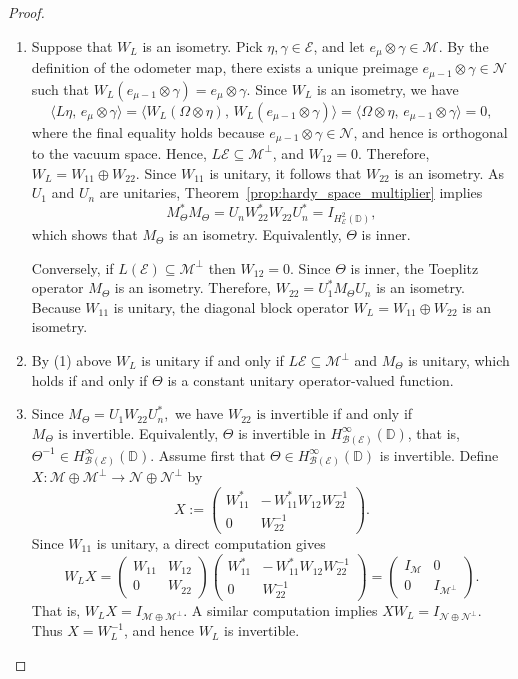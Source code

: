 \documentclass[10pt,a4paper]{amsart}
\def \D{\mathbb{D}}
\newcommand{\clb}{\mathcal{B}}
\newcommand{\cle}{\mathcal{E}}
\newcommand{\clm}{\mathcal{M}}
\newcommand{\cln}{\mathcal{N}}
\begin{document}
\begin{proof}
\begin{enumerate}
        \item 
Suppose that $W_L$ is an isometry. Pick $\eta, \gamma \in \cle$, and let $e_\mu \otimes \gamma \in \clm$. By the definition of the odometer map, there exists a unique preimage $e_{\mu-1} \otimes  \gamma \in \cln$ such that $W_L( e_{\mu-1} \otimes  \gamma)=e_\mu \otimes \gamma$.
Since $W_L$ is an isometry, we have
\[
\langle L\eta,\, e_\mu \otimes \gamma \rangle
=
\langle W_L(\Omega \otimes \eta),\, W_L( e_{\mu-1} \otimes  \gamma) \rangle
= \langle \Omega \otimes \eta,\, e_{\mu-1} \otimes  \gamma \rangle = 0,
\]
where the final equality holds because $e_{\mu-1}\otimes\gamma \in \cln$, and hence is orthogonal to the vacuum space. Hence, $L\cle \subseteq \clm^\perp$, and $W_{12} = 0$. Therefore, $W_L = W_{11} \oplus W_{22}$. Since $W_{11}$ is unitary, it follows that $W_{22}$ is an isometry. As $U_1$ and $U_n$ are unitaries, Theorem~\ref{prop:hardy_space_multiplier} implies
\[
M_{\Theta}^*M_{\Theta}
=
U_n W_{22}^* W_{22} U_n^*
=
I_{H^2_\cle(\D)},
\]
which shows that $M_{\Theta}$ is an isometry. Equivalently, $\Theta$ is inner.

Conversely, if $L(\cle)\subseteq \clm^\perp$ then $W_{12}=0.$ Since $\Theta$ is inner, the Toeplitz operator $M_\Theta$ is an isometry. Therefore, $W_{22}=U_1^*M_\Theta U_n$ is an isometry. Because $W_{11}$ is unitary, the diagonal block operator $W_L = W_{11} \oplus W_{22}$ is an isometry.

\item By (1) above \(W_L\) is unitary if
and only if $L\cle\subseteq\clm^\perp$ and \(M_\Theta\) is unitary, which holds if and only if \(\Theta\) is
a constant unitary operator-valued function.
\item
Since $M_\Theta = U_1 W_{22} U_n^*,$ we have $W_{22}\text{ is invertible}$ if and only if $
M_\Theta\text{ is invertible}.$
Equivalently, \(\Theta\) is invertible in
\(H^\infty_{\clb(\cle)}(\D)\), that is,
\(\Theta^{-1}\in H^\infty_{\clb(\cle)}(\D)\).
Assume first that $\Theta \in H^\infty_{\clb(\cle)}(\D)$ is invertible. Define $X:\clm\oplus \clm^\perp \to \cln\oplus \cln^\perp$ by
\[
X:=
\begin{pmatrix} 
W_{11}^* & -\,W_{11}^*W_{12}W_{22}^{-1}\\
0 & W_{22}^{-1}
\end{pmatrix}.
\]
Since $W_{11}$ is unitary, a direct computation gives
\[
W_LX=
\begin{pmatrix}
W_{11} & W_{12}\\
0 & W_{22}
\end{pmatrix}
\begin{pmatrix}
W_{11}^* & -\,W_{11}^*W_{12}W_{22}^{-1}\\
0 & W_{22}^{-1}
\end{pmatrix}
=
\begin{pmatrix}
I_{\clm} & 0\\
0 & I_{\clm^\perp}
\end{pmatrix}.
\]
That is, $W_LX=I_{\clm\oplus \clm^\perp}$. A similar computation implies $XW_L= I_{\cln\oplus \cln^\perp}.$
Thus $X=W_L^{-1}$, and hence $W_L$ is invertible.



\end{enumerate}
\end{proof}
\end{document}
